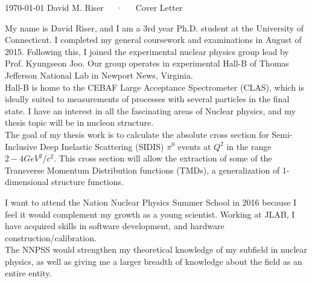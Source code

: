 \documentclass[11pt, a4paper]{awesome-cv}
\begin{document}
\makecvheader

\makecvfooter
  {\today}
  {David M. Riser~~~·~~~Cover Letter}
  {}


\begin{cvletter}

My name is David Riser, and I am a 3rd year Ph.D. student at the University of Connecticut.  I completed my general coursework and examinations in August of 2015.  Following this, I joined the experimental nuclear physics group lead by Prof. Kyungseon Joo.  Our group operates in experimental Hall-B of Thomas Jefferson National Lab in Newport News, Virginia.  \\

Hall-B is home to the CEBAF Large Acceptance Spectrometer (CLAS), which is ideally suited to measurements of processes with several particles in the final state.  I have an interest in all the fascinating areas of Nuclear physics, and my thesis topic will be in nucleon structure.  \\

The goal of my thesis work is to calculate the absolute cross section for Semi-Inclusive Deep Inelastic Scattering (SIDIS) $\pi^0$ events at $Q^2 $ in the range $2-4 GeV^2/c^2$.  This cross section will allow the extraction of some of the Transverse Momentum Distribution functions (TMDs), a generalization of 1-dimensional structure functions.    

I want to attend the Nation Nuclear Physics Summer School in 2016 because I feel it would complement my growth as a young scientist.  Working at JLAB, I have acquired skills in software development, and hardware construction/calibration.  \\

The NNPSS would strengthen my theoretical knowledge of my subfield in nuclear physics, as well as giving me a larger breadth of knowledge about the field as an entire entity. 

\end{cvletter}


\makeletterclosing
\end{document}
